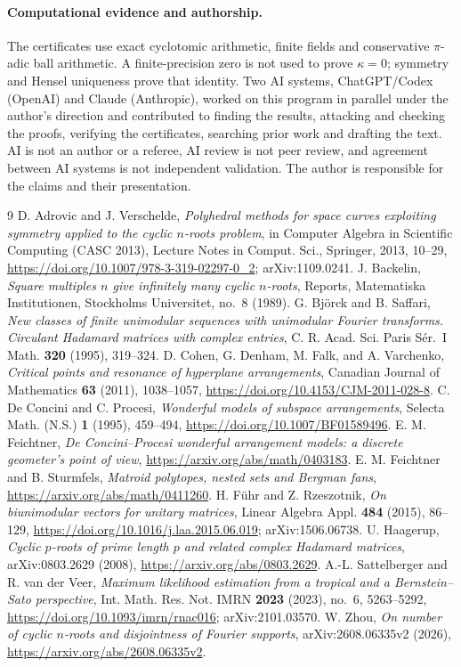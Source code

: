 \documentclass[11pt]{article}
\theoremstyle{remark}\newtheorem{remark}[theorem]{Remark}
\begin{document}
\paragraph{Computational evidence and authorship.}
The certificates use exact cyclotomic arithmetic, finite fields and
conservative $\pi$-adic ball arithmetic.
A finite-precision zero is not used to prove $\kappa=0$; symmetry and
Hensel uniqueness prove that identity.
Two AI systems, ChatGPT/Codex (OpenAI) and Claude (Anthropic), worked on
this program in parallel under the author's direction and contributed to
finding the results, attacking and checking the proofs, verifying the
certificates, searching prior work and drafting the text. AI is not an author
or a referee, AI review is not peer review, and agreement between AI systems
is not independent validation. The author is responsible for the claims and
their presentation.

\begin{thebibliography}{9}
 D. Adrovic and J. Verschelde,
\emph{Polyhedral methods for space curves exploiting symmetry applied to the
cyclic $n$-roots problem}, in Computer Algebra in Scientific Computing (CASC 2013), Lecture Notes in Comput. Sci., Springer, 2013, 10--29, \url{https://doi.org/10.1007/978-3-319-02297-0_2}; arXiv:1109.0241.
 J. Backelin,
\emph{Square multiples $n$ give infinitely many cyclic $n$-roots},
Reports, Matematiska Institutionen, Stockholms Universitet, no.~8 (1989).
 G. Bj\"orck and B. Saffari,
\emph{New classes of finite unimodular sequences with unimodular Fourier
transforms. Circulant Hadamard matrices with complex entries},
C. R. Acad. Sci. Paris S\'er.~I Math. \textbf{320} (1995), 319--324.
 D. Cohen, G. Denham, M. Falk, and A. Varchenko,
\emph{Critical points and resonance of hyperplane arrangements},
Canadian Journal of Mathematics \textbf{63} (2011), 1038--1057,
\url{https://doi.org/10.4153/CJM-2011-028-8}.
 C. De Concini and C. Procesi,
\emph{Wonderful models of subspace arrangements},
Selecta Math. (N.S.) \textbf{1} (1995), 459--494,
\url{https://doi.org/10.1007/BF01589496}.
 E. M. Feichtner,
\emph{De Concini--Procesi wonderful arrangement models: a discrete
geometer's point of view},
\url{https://arxiv.org/abs/math/0403183}.
 E. M. Feichtner and B. Sturmfels,
\emph{Matroid polytopes, nested sets and Bergman fans},
\url{https://arxiv.org/abs/math/0411260}.
 H. F\"uhr and Z. Rzeszotnik,
\emph{On biunimodular vectors for unitary matrices},
Linear Algebra Appl. \textbf{484} (2015), 86--129, \url{https://doi.org/10.1016/j.laa.2015.06.019}; arXiv:1506.06738.
 U. Haagerup,
\emph{Cyclic $p$-roots of prime length $p$ and related complex Hadamard matrices},
arXiv:0803.2629 (2008), \url{https://arxiv.org/abs/0803.2629}.
 A.-L. Sattelberger and R. van der Veer,
\emph{Maximum likelihood estimation from a tropical and a Bernstein--Sato
perspective}, Int. Math. Res. Not. IMRN \textbf{2023} (2023), no.~6,
5263--5292, \url{https://doi.org/10.1093/imrn/rnac016}; arXiv:2101.03570.
 W. Zhou,
\emph{On number of cyclic $n$-roots and disjointness of Fourier supports},
arXiv:2608.06335v2 (2026), \url{https://arxiv.org/abs/2608.06335v2}.
\end{thebibliography}
\end{document}
